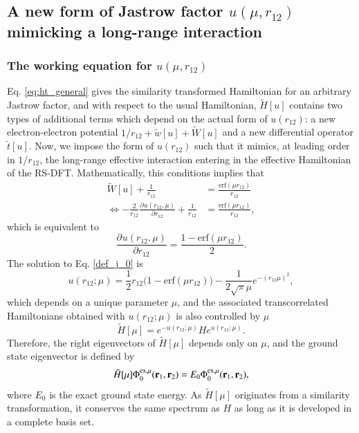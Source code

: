 \documentclass[aip,jcp,reprint,noshowkeys,superscriptaddress]{revtex4-1}
\newcommand{\deriv}[3]{\frac{\partial^{#3} #1}{\partial {#2}^{#3}}}
\newcommand{\br}[0]{{\bf {r}}}
\newcommand{\phimu}[0]{\Phi^{\text{ex},\mu}_0}
\begin{document}
\subsection{A new form of Jastrow factor $u(\mu,r_{12})$ mimicking a long-range interaction}
\label{sec:new_j}
\subsubsection{The working equation for $u(\mu,r_{12})$ }
Eq. \eqref{eq:ht_general} gives the similarity transformed Hamiltonian for an arbitrary Jastrow factor, 
and with respect to the usual Hamiltonian, $\tilde{H}[u]$ contains two types of additional terms which depend on the actual form of $u(r_{12})$: 
a new electron-electron potential $1/r_{12} + \tilde{w}[u]+ \tilde{W}[u]$ and a new differential operator  $\tilde{t}[u] $.  
Now, we impose the form of $u(r_{12})$ such that it mimics, at leading order in $1/r_{12}$, the long-range effective interaction entering in the effective Hamiltonian of the RS-DFT. 
Mathematically, this conditions implies that 
\begin{equation}
 \begin{aligned}
 \label{def_j_00}
 \tilde{W}[u] + \frac{1}{r_{12}}&= \frac{\text{erf}(\mu r_{12})}{r_{12}} \\ 
\Leftrightarrow -\frac{2}{r_{12}} \deriv{u(r_{12},\mu)}{r_{12}}{} + \frac{1}{r_{12}} & = \frac{\text{erf}(\mu r_{12})}{r_{12}}, 
 \end{aligned}
\end{equation}
which is equivalent to 
\begin{equation}
 \label{def_j_0}
 \deriv{u(r_{12},\mu)}{r_{12}}{} = \frac{1 - \text{erf}(\mu r_{12})}{2}.
\end{equation}
The solution to Eq. \eqref{def_j_0} is 
\begin{equation}
 \label{eq:def_j}
 u(r_{12};\mu) = \frac{1}{2}r_{12}\bigg( 1 - \text{erf}(\mu r_{12})  \bigg) - \frac{1}{2\sqrt{\pi}\mu}e^{-(r_{12}\mu)^2},
\end{equation}
which depends on a unique parameter $\mu$,  
and the associated transcorrelated Hamiltonians obtained with $u(r_{12};\mu)$ is also controlled by $\mu$
\begin{equation}
 \label{eq:def_ht_mu}
 \tilde{H}[\mu] = e^{-u(r_{12};\mu)} H e^{u(r_{12};\mu)}. 
\end{equation}
Therefore, the right eigenvectors of $\tilde{H}[\mu]$ depends only on $\mu$, and the ground state eigenvector is defined by 
\begin{equation}
 \tilde{H}[\mu] \phimu(\br{}_{1},\br{}_{2}) = E_0 \phimu(\br{}_{1},\br{}_{2}), 
\end{equation}
where $E_0$ is the exact ground state energy. 
As $\tilde{H}[\mu]$ originates from a similarity transformation, it conserves the same spectrum as $H$ as long as it is developed in a complete basis set. 
\end{document}
